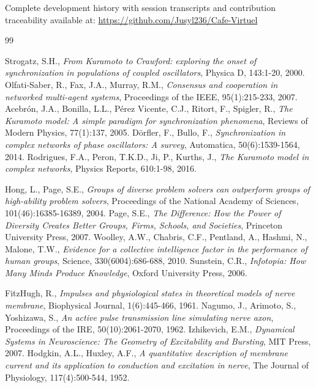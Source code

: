 \documentclass[11pt]{article}
\begin{document}
Complete development history with session transcripts and contribution traceability available at: \url{https://github.com/Jusyl236/Cafe-Virtuel}


\begin{thebibliography}{99}

 Strogatz, S.H., \emph{From Kuramoto to Crawford: exploring the onset of synchronization in populations of coupled oscillators}, Physica D, 143:1-20, 2000.
 Olfati-Saber, R., Fax, J.A., Murray, R.M., \emph{Consensus and cooperation in networked multi-agent systems}, Proceedings of the IEEE, 95(1):215-233, 2007.
 Acebrón, J.A., Bonilla, L.L., Pérez Vicente, C.J., Ritort, F., Spigler, R., \emph{The Kuramoto model: A simple paradigm for synchronization phenomena}, Reviews of Modern Physics, 77(1):137, 2005.
 Dörfler, F., Bullo, F., \emph{Synchronization in complex networks of phase oscillators: A survey}, Automatica, 50(6):1539-1564, 2014.
 Rodrigues, F.A., Peron, T.K.D., Ji, P., Kurths, J., \emph{The Kuramoto model in complex networks}, Physics Reports, 610:1-98, 2016.

 Hong, L., Page, S.E., \emph{Groups of diverse problem solvers can outperform groups of high-ability problem solvers}, Proceedings of the National Academy of Sciences, 101(46):16385-16389, 2004.
 Page, S.E., \emph{The Difference: How the Power of Diversity Creates Better Groups, Firms, Schools, and Societies}, Princeton University Press, 2007.
 Woolley, A.W., Chabris, C.F., Pentland, A., Hashmi, N., Malone, T.W., \emph{Evidence for a collective intelligence factor in the performance of human groups}, Science, 330(6004):686-688, 2010.
 Sunstein, C.R., \emph{Infotopia: How Many Minds Produce Knowledge}, Oxford University Press, 2006.

 FitzHugh, R., \emph{Impulses and physiological states in theoretical models of nerve membrane}, Biophysical Journal, 1(6):445-466, 1961.
 Nagumo, J., Arimoto, S., Yoshizawa, S., \emph{An active pulse transmission line simulating nerve axon}, Proceedings of the IRE, 50(10):2061-2070, 1962.
 Izhikevich, E.M., \emph{Dynamical Systems in Neuroscience: The Geometry of Excitability and Bursting}, MIT Press, 2007.
 Hodgkin, A.L., Huxley, A.F., \emph{A quantitative description of membrane current and its application to conduction and excitation in nerve}, The Journal of Physiology, 117(4):500-544, 1952.


\end{thebibliography}
\end{document}
